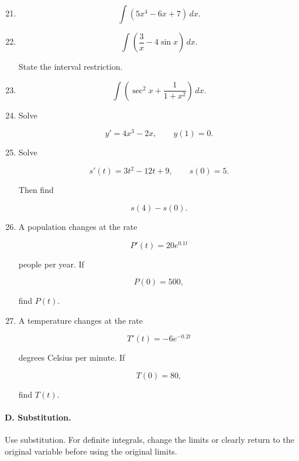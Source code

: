 \begin{enumerate}
\setcounter{enumi}{20}

\item

\[
\int (5x^4-6x+7)\,dx.
\]

\item

\[
\int \left(\frac3x-4\sin x\right)\,dx.
\]

State the interval restriction.

\item

\[
\int \left(\sec^2 x+\frac{1}{1+x^2}\right)\,dx.
\]

\item Solve

\[
y'=4x^3-2x,
\qquad
y(1)=0.
\]

\item Solve

\[
s'(t)=3t^2-12t+9,
\qquad
s(0)=5.
\]

Then find

\[
s(4)-s(0).
\]

\item A population changes at the rate

\[
P'(t)=20e^{0.1t}
\]

people per year.  If

\[
P(0)=500,
\]

find \(P(t)\).

\item A temperature changes at the rate

\[
T'(t)=-6e^{-0.2t}
\]

degrees Celsius per minute.  If

\[
T(0)=80,
\]

find \(T(t)\).

\end{enumerate}

\paragraph{D. Substitution.}

Use substitution.  For definite integrals, change the limits or clearly return to the
original variable before using the original limits.

